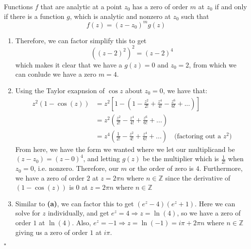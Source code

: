 \documentclass[11pt]{article}
\newcommand{\Z}{\mathbb{Z}}
\newenvironment{proof}{\noindent{\bf Proof.}}{\hfill $\square$\medskip}
\begin{document}
\begin{proof}
    Functions $f$ that are analytic at a point $z_{0}$ has a zero of order $m$ at $z_{0}$ if and only if there is a function $g$, which is analytic and nonzero at $z_{0}$ such that
    $$f(z)=(z-z_{0})^{m}g(z)$$
    \begin{enumerate}[label=\textbf{(\alph*)}]
        \item Therefore, we can factor simplify this to get
              $$((z-2)^{2})^{2}=(z-2)^{4}$$
              which makes it clear that we have a $g(z)=0$ and $z_{0}=2$, from which we can conlude we have a zero $m=4$.
        \item Using the Taylor exapnsion of $\cos z$ about $z_{0}=0$, we have that:
              \begin{equation}
                  \begin{split}
                      z^{2}(1-\cos(z))&=z^{2}\left[1-\left(1-\frac{z^{2}}{2!}+\frac{z^{4}}{4!}-\frac{z^{6}}{6!}+...\right)\right]\\
                      &=z^{2}\left(\frac{z^{2}}{2!}-\frac{z^{4}}{4!}+\frac{z^{6}}{6!}+...\right)\\
                      &=z^{4}\left(\frac{1}{2!}-\frac{z^{2}}{4!}+\frac{z^{4}}{6!}+...\right)\quad\text{(factoring out a }z^{2}\text{)}
                  \end{split}
              \end{equation}
              From here, we have the form we wanted where we let our multiplicand be $(z-z_{0})=(z-0)^{4}$, and letting $g(z)$ be the multiplier which is $\frac{1}{2!}$ when $z_{0}=0$, i.e. nonzero. Therefore, our $m$ or the order of zero is $4$. Furthermore, we have a zero of order $2$ at $z=2\pi n$ where $n\in\Z$ since the derivative of $(1-\cos(z))$ is $0$ at $z=2\pi n$  where $n\in\Z$
        \item Similar to \textbf{(a)}, we can factor this to get $(e^{z}-4)(e^{z}+1)$. Here we can solve for $z$ individually, and get $e^{z}=4\Rightarrow z=\ln(4)$, so we have a zero of order $1$ at $\ln(4)$. Also, $e^{z}=-1\Rightarrow z=\ln(-1)=i\pi +2\pi n$ where $n\in \Z$ giving us a zero of order $1$ at $i\pi$.
    \end{enumerate}
\end{proof}


\newpage
\end{document}
